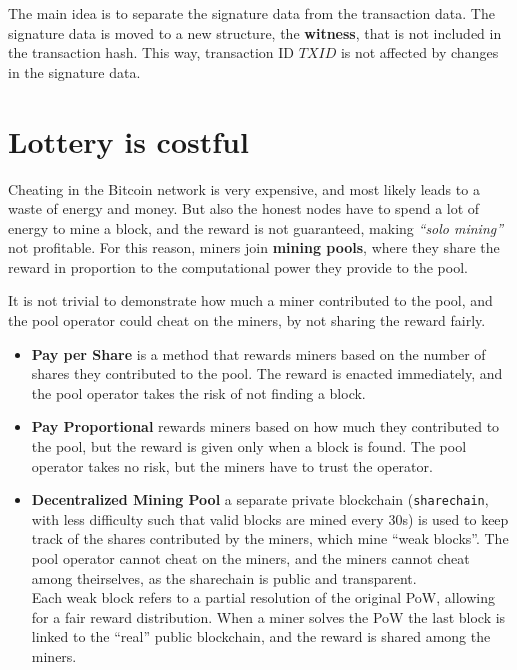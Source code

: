 The main idea is to separate the signature data from the transaction data. The signature data is moved to a new structure, the \textbf{witness}, that is not included in the transaction hash. This way, transaction ID $TXID$ is not affected by changes in the signature data.

\section{Lottery is costful}

Cheating in the Bitcoin network is very expensive, and most likely leads to a waste of energy and money.
But also the honest nodes have to spend a lot of energy to mine a block, and the reward is not guaranteed, making \textit{``solo mining''} not profitable.
For this reason, miners join \textbf{mining pools}, where they share the reward in proportion to the computational power they provide to the pool.

It is not trivial to demonstrate how much a miner contributed to the pool, and the pool operator could cheat on the miners, by not sharing the reward fairly.
\begin{itemize}
   \item \textbf{Pay per Share} is a method that rewards miners based on the number of shares they contributed to the pool. The reward is enacted immediately, and the pool operator takes the risk of not finding a block.
   \item \textbf{Pay Proportional} rewards miners based on how much they contributed to the pool, but the reward is given only when a block is found. The pool operator takes no risk, but the miners have to trust the operator.
   \item \textbf{Decentralized Mining Pool} a separate private blockchain (\texttt{sharechain}, with less difficulty such that valid blocks are mined every 30s) is used to keep track of the shares contributed by the miners, which mine ``weak blocks''. The pool operator cannot cheat on the miners, and the miners cannot cheat among theirselves, as the sharechain is public and transparent.\\
   Each weak block refers to a partial resolution of the original PoW, allowing for a fair reward distribution.
   When a miner solves the PoW the last block is linked to the ``real'' public blockchain, and the reward is shared among the miners.
\end{itemize}